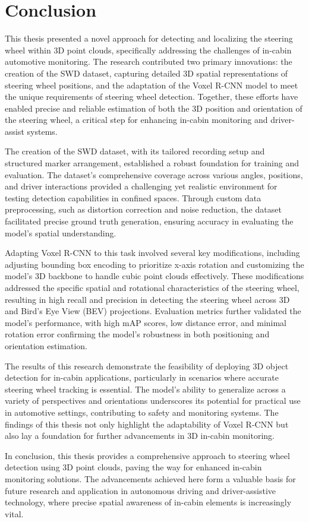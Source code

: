 \chapter{Conclusion}

This thesis presented a novel approach for detecting and localizing the steering wheel within 3D point clouds, specifically addressing the challenges of in-cabin automotive monitoring. The research contributed two primary innovations: the creation of the SWD dataset, capturing detailed 3D spatial representations of steering wheel positions, and the adaptation of the Voxel R-CNN model to meet the unique requirements of steering wheel detection. Together, these efforts have enabled precise and reliable estimation of both the 3D position and orientation of the steering wheel, a critical step for enhancing in-cabin monitoring and driver-assist systems.

The creation of the SWD dataset, with its tailored recording setup and structured marker arrangement, established a robust foundation for training and evaluation. The dataset’s comprehensive coverage across various angles, positions, and driver interactions provided a challenging yet realistic environment for testing detection capabilities in confined spaces. Through custom data preprocessing, such as distortion correction and noise reduction, the dataset facilitated precise ground truth generation, ensuring accuracy in evaluating the model’s spatial understanding.

Adapting Voxel R-CNN to this task involved several key modifications, including adjusting bounding box encoding to prioritize x-axis rotation and customizing the model’s 3D backbone to handle cubic point clouds effectively. These modifications addressed the specific spatial and rotational characteristics of the steering wheel, resulting in high recall and precision in detecting the steering wheel across 3D and Bird’s Eye View (BEV) projections. Evaluation metrics further validated the model’s performance, with high mAP scores, low distance error, and minimal rotation error confirming the model’s robustness in both positioning and orientation estimation.

The results of this research demonstrate the feasibility of deploying 3D object detection for in-cabin applications, particularly in scenarios where accurate steering wheel tracking is essential. The model’s ability to generalize across a variety of perspectives and orientations underscores its potential for practical use in automotive settings, contributing to safety and monitoring systems. The findings of this thesis not only highlight the adaptability of Voxel R-CNN but also lay a foundation for further advancements in 3D in-cabin monitoring.

In conclusion, this thesis provides a comprehensive approach to steering wheel detection using 3D point clouds, paving the way for enhanced in-cabin monitoring solutions. The advancements achieved here form a valuable basis for future research and application in autonomous driving and driver-assistive technology, where precise spatial awareness of in-cabin elements is increasingly vital.